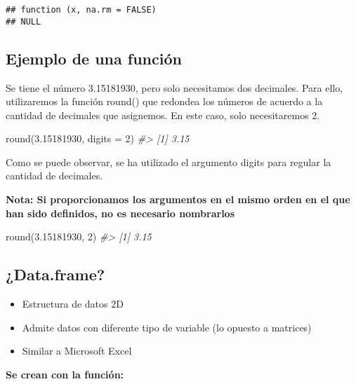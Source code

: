 \documentclass[
]{book}
\newenvironment{Shaded}{\begin{snugshade}}{\end{snugshade}}
\newcommand{\AttributeTok}[1]{\textcolor[rgb]{0.77,0.63,0.00}{#1}}
\newcommand{\CommentTok}[1]{\textcolor[rgb]{0.56,0.35,0.01}{\textit{#1}}}
\newcommand{\DecValTok}[1]{\textcolor[rgb]{0.00,0.00,0.81}{#1}}
\newcommand{\FloatTok}[1]{\textcolor[rgb]{0.00,0.00,0.81}{#1}}
\newcommand{\FunctionTok}[1]{\textcolor[rgb]{0.00,0.00,0.00}{#1}}
\newcommand{\NormalTok}[1]{#1}
\begin{document}
\begin{verbatim}
## function (x, na.rm = FALSE) 
## NULL
\end{verbatim}

\hypertarget{ejemplo-de-una-funciuxf3n}{%
\subsection{Ejemplo de una función}\label{ejemplo-de-una-funciuxf3n}}

Se tiene el número 3.15181930, pero solo necesitamos dos decimales. Para ello, utilizaremos la función round() que redondea los números de acuerdo a la cantidad de decimales que asignemos. En este caso, solo necesitaremos 2.

\begin{Shaded}
\begin{Highlighting}[]
\FunctionTok{round}\NormalTok{(}\FloatTok{3.15181930}\NormalTok{, }\AttributeTok{digits =} \DecValTok{2}\NormalTok{)}
\CommentTok{\#\textgreater{} [1] 3.15}
\end{Highlighting}
\end{Shaded}

Como se puede observar, se ha utilizado el argumento digits para regular la cantidad de decimales.

\textbf{Nota: Si proporcionamos los argumentos en el mismo orden en el que han sido definidos, no es necesario nombrarlos}

\begin{Shaded}
\begin{Highlighting}[]
\FunctionTok{round}\NormalTok{(}\FloatTok{3.15181930}\NormalTok{, }\DecValTok{2}\NormalTok{)}
\CommentTok{\#\textgreater{} [1] 3.15}
\end{Highlighting}
\end{Shaded}

\hypertarget{data.frame}{%
\subsection{¿Data.frame?}\label{data.frame}}

\begin{itemize}
\item
  Estructura de datos 2D
\item
  Admite datos con diferente tipo de variable (lo opuesto a matrices)
\item
  Similar a Microsoft Excel
\end{itemize}

\textbf{Se crean con la función:}
\end{document}
